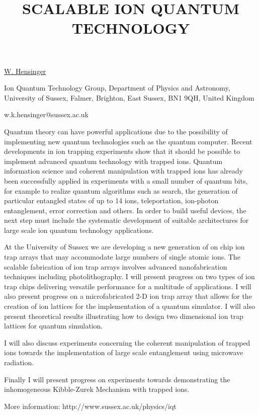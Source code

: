\title{SCALABLE ION QUANTUM TECHNOLOGY}

\underline{W. Hensinger} 

{\normalsize{\vspace{-4mm}
Ion Quantum Technology Group, Department of Physics and Astronomy,
University of Sussex, Falmer, Brighton, East Sussex, BN1 9QH, United Kingdom

\email w.k.hensinger@sussex.ac.uk}}

Quantum theory can have powerful applications due to the possibility of implementing new quantum
technologies such as the quantum computer. Recent developments in ion trapping experiments show that
it should be possible to implement advanced quantum technology with trapped ions. Quantum
information science and coherent manipulation with trapped ions has already been successfully
applied in experiments with a small number of quantum bits, for example to realize quantum
algorithms such as search, the generation of particular entangled states of up to 14 ions,
teleportation, ion-photon entanglement, error correction and others. In order to build useful
devices, the next step must include the systematic development of suitable architectures for large
scale ion quantum technology applications.

At the University of Sussex we are developing a new generation of on chip ion trap arrays that may
accommodate large numbers of single atomic ions. The scalable fabrication of ion trap arrays
involves advanced nanofabrication techniques including photolithography. I will present progress on
two types of ion trap chips delivering versatile performance for a multitude of applications. I will
also present progress on a microfabricated 2-D ion trap array that allows for the creation of ion
lattices for the implementation of a quantum simulator. I will also present theoretical results
illustrating how to design two dimensional ion trap lattices for quantum simulation.

I will also discuss experiments concerning the coherent manipulation of trapped ions towards the
implementation of large scale entanglement using microwave radiation.

Finally I will present progress on experiments towards demonstrating the inhomogeneous Kibble-Zurek
Mechanism with trapped ions.

More information: http://www.sussex.ac.uk/physics/iqt

\vspace{\baselineskip} 